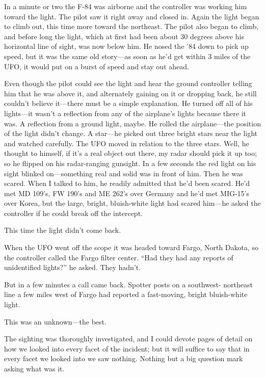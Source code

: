 \begin{svgraybox}
In a minute or two the F-84 was airborne and the controller was
working him toward the light. The pilot saw it right away and closed
in. Again the light began to climb out, this time more toward the
northeast. The pilot also began to climb, and before long the light,
which at first had been about 30 degrees above his horizontal line of
sight, was now below him. He nosed the '84 down to pick up speed, but
it was the same old story---as soon as he'd get within 3 miles of the
UFO, it would put on a burst of speed and stay out ahead.

Even though the pilot could see the light and hear the ground
controller telling him that he was above it, and alternately gaining
on it or dropping back, he still couldn't believe it---there must be a
simple explanation. He turned off all of his lights---it wasn't a
reflection from any of the airplane's lights because there it was. A
reflection from a ground light, maybe. He rolled the airplane---the
position of the light didn't change. A star---he picked out three
bright stars near the light and watched carefully. The UFO moved in
relation to the three stars. Well, he thought to himself, if it's a
real object out there, my radar should pick it up too; so he flipped
on his radar-ranging gunsight. In a few seconds the red light on his
sight blinked on---something real and solid was in front of him. Then
he was scared. When I talked to him, he readily admitted that he'd
been scared. He'd met MD 109's, FW 190's and ME 262's over Germany
and he'd met MIG-15's over Korea, but the large, bright, bluish-white
light had scared him---he asked the controller if he could break off
the intercept.

This time the light didn't come back.

When the UFO went off the scope it was headed toward Fargo, North
Dakota, so the controller called the Fargo filter center. ``Had they
had any reports of unidentified lights?'' he asked. They hadn't.

But in a few minutes a call came back. Spotter posts on a southwest-
northeast line a few miles west of Fargo had reported a fast-moving,
bright bluish-white light.

This was an unknown---the best.

The sighting was thoroughly investigated, and I could devote pages
of detail on how we looked into every facet of the incident; but it
will suffice to say that in every facet we looked into we saw
nothing. Nothing but a big question mark asking what was it.
\end{svgraybox}

